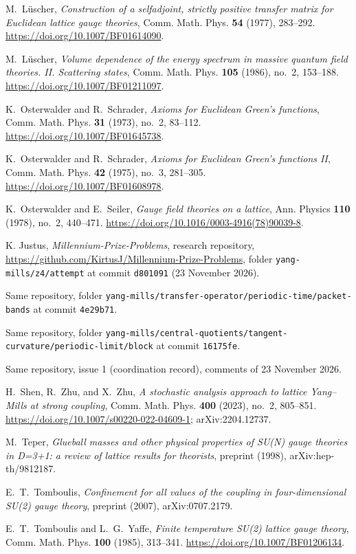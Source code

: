 M.~L\"uscher, \emph{Construction of a selfadjoint, strictly positive transfer matrix for Euclidean lattice gauge theories},
Comm. Math. Phys. \textbf{54} (1977), 283--292.
\url{https://doi.org/10.1007/BF01614090}.

M.~L\"uscher, \emph{Volume dependence of the energy spectrum in massive quantum field theories. II. Scattering states},
Comm. Math. Phys. \textbf{105} (1986), no.~2, 153--188.
\url{https://doi.org/10.1007/BF01211097}.

K.~Osterwalder and R.~Schrader, \emph{Axioms for Euclidean Green's functions},
Comm. Math. Phys. \textbf{31} (1973), no.~2, 83--112.
\url{https://doi.org/10.1007/BF01645738}.

K.~Osterwalder and R.~Schrader, \emph{Axioms for Euclidean Green's functions II},
Comm. Math. Phys. \textbf{42} (1975), no.~3, 281--305.
\url{https://doi.org/10.1007/BF01608978}.

K.~Osterwalder and E.~Seiler, \emph{Gauge field theories on a lattice},
Ann. Physics \textbf{110} (1978), no.~2, 440--471.
\url{https://doi.org/10.1016/0003-4916(78)90039-8}.

 K. Justus, \emph{Millennium-Prize-Problems}, research repository, \url{https://github.com/KirtusJ/Millennium-Prize-Problems}, folder \texttt{yang-mills/z4/attempt} at commit \texttt{d801091} (23 November 2026).

 Same repository, folder \texttt{yang-mills/transfer-operator/periodic-time/packet-bands} at commit \texttt{4e29b71}.

 Same repository, folder \texttt{yang-mills/central-quotients/tangent-curvature/periodic-limit/block} at commit \texttt{16175fe}.

 Same repository, issue 1 (coordination record), comments of 23 November 2026.

H.~Shen, R.~Zhu, and X.~Zhu, \emph{A stochastic analysis approach to lattice Yang--Mills at strong coupling},
Comm. Math. Phys. \textbf{400} (2023), no.~2, 805--851.
\url{https://doi.org/10.1007/s00220-022-04609-1}; arXiv:2204.12737.

M.~Teper, \emph{Glueball masses and other physical properties of SU(N) gauge theories in D=3+1: a review of lattice results for theorists},
preprint (1998), arXiv:hep-th/9812187.

E.~T.~Tomboulis, \emph{Confinement for all values of the coupling in four-dimensional SU(2) gauge theory},
preprint (2007), arXiv:0707.2179.

E.~T.~Tomboulis and L.~G.~Yaffe, \emph{Finite temperature SU(2) lattice gauge theory},
Comm. Math. Phys. \textbf{100} (1985), 313--341.
\url{https://doi.org/10.1007/BF01206134}.
